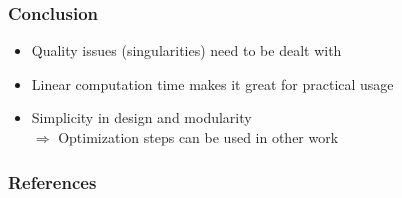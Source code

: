 \documentclass[aspectratio=43,sanserif,professionalfonts]{beamer}
\begin{document}
\begin{frame}
	\frametitle{Conclusion}
	\begin{itemize}
		\item	Quality issues (singularities) need to be dealt with
		\item	Linear computation time makes it great for practical usage
		\item	Simplicity in design and modularity\\
				$\Rightarrow$ Optimization steps can be used in other work
	\end{itemize}
\end{frame}

\begin{frame}[allowframebreaks]
	\frametitle{References}
	\nocite{*}
	
	
\end{frame}
\end{document}

